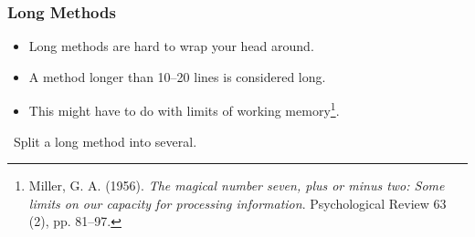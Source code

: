 \begin{frame}

\frametitle{Long Methods}

\begin{itemize}

\item Long methods are hard to wrap your head around.

\item A method longer than 10--20 lines is considered long.

\item This might have to do with limits of working memory\footnote{Miller, G.
A. (1956). \emph{The magical number seven, plus or minus two: Some limits on
our capacity for processing information}. Psychological Review 63 (2), pp.
81--97.}.

\end{itemize}

\vspace{\fill}

\begin{center}

\leftthumbsup~Split a long method into several.~\rightthumbsup

\end{center}

\vspace{\fill}

\end{frame}
